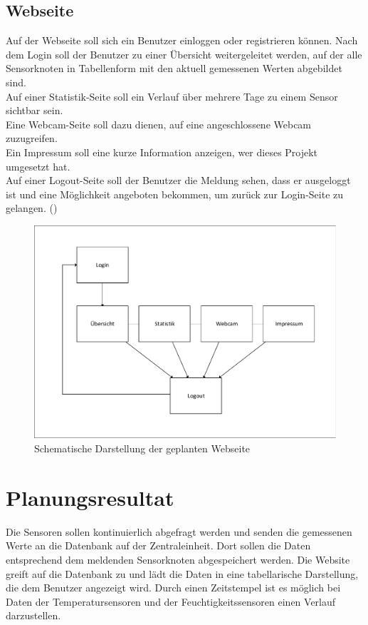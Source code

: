 \subsection{Webseite}\label{sub:Webseite}

Auf der Webseite soll sich ein Benutzer einloggen oder registrieren können.
Nach dem Login soll der Benutzer zu einer Übersicht weitergeleitet werden, auf der alle Sensorknoten in Tabellenform mit den aktuell gemessenen Werten abgebildet sind. \\
Auf einer Statistik-Seite soll ein Verlauf über mehrere Tage zu einem Sensor sichtbar sein.\\
Eine Webcam-Seite soll dazu dienen, auf eine angeschlossene Webcam zuzugreifen.\\
Ein Impressum soll eine kurze Information anzeigen, wer dieses Projekt umgesetzt hat.\\
Auf einer Logout-Seite soll der Benutzer die Meldung sehen, dass er ausgeloggt ist und eine Möglichkeit angeboten bekommen, um zurück zur Login-Seite zu gelangen.
()

\begin{figure} [hbt]
\begin{centering}
\includegraphics[scale=0.8]{Bilder/Kapitel3/struktur_website_einfach.pdf}
\caption[Schematische Darstellung der geplanten Webseite]{Schematische
Darstellung der geplanten Webseite}
\label{Darstellung_Website_einfach}
\end{centering}
\end{figure}
\newpage
\section{Planungsresultat}

Die Sensoren sollen kontinuierlich abgefragt werden und senden die gemessenen Werte an
die Datenbank auf der Zentraleinheit. Dort sollen die Daten entsprechend dem
meldenden Sensorknoten abgespeichert werden. Die Website greift auf die Datenbank zu
und lädt die Daten in eine tabellarische Darstellung, die dem Benutzer angezeigt wird. Durch einen Zeitstempel ist es möglich bei Daten der Temperatursensoren
und der Feuchtigkeitssensoren einen Verlauf darzustellen.
